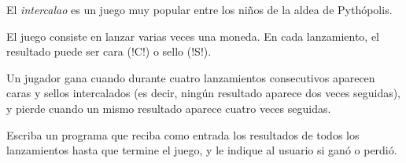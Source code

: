 El \emph{intercalao} es un juego muy popular
entre los niños de la aldea de Pythópolis.

El juego consiste en lanzar varias veces una moneda.
En cada lanzamiento,
el resultado puede ser cara (\li!C!) o sello (\li!S!).

Un jugador gana cuando durante cuatro lanzamientos consecutivos
aparecen caras y sellos intercalados
(es decir, ningún resultado aparece dos veces seguidas),
y pierde cuando un mismo resultado aparece
cuatro veces seguidas.

Escriba un programa que reciba como entrada
los resultados de todos los lanzamientos
hasta que termine el juego,
y le indique al usuario si ganó o perdió.

\begin{minipage}[t]{.26\textwidth}
  
\end{minipage}
\hspace{1em}
\begin{minipage}[t]{.26\textwidth}
  
\end{minipage}

